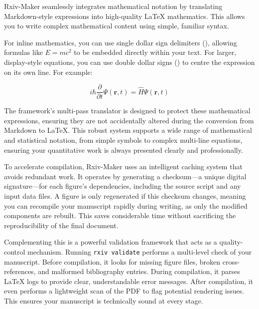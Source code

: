 Rxiv-Maker seamlessly integrates mathematical notation by translating Markdown-style expressions into high-quality LaTeX mathematics. This allows you to write complex mathematical content using simple, familiar syntax.

For inline mathematics, you can use single dollar sign delimiters (\texttt{}), allowing formulas like $E = mc^2$ to be embedded directly within your text. For larger, display-style equations, you can use double dollar signs (\texttt{}) to centre the expression on its own line. For example:

$$
i\hbar\frac{\partial}{\partial t}\Psi(\mathbf{r},t) = \hat{H}\Psi(\mathbf{r},t)
$$

The framework's multi-pass translator is designed to protect these mathematical expressions, ensuring they are not accidentally altered during the conversion from Markdown to LaTeX. This robust system supports a wide range of mathematical and statistical notation, from simple symbols to complex multi-line equations, ensuring your quantitative work is always presented clearly and professionally.

\label{snote:caching_validation}

To accelerate compilation, Rxiv-Maker uses an intelligent caching system that avoids redundant work. It operates by generating a checksum—a unique digital signature—for each figure's dependencies, including the source script and any input data files. A figure is only regenerated if this checksum changes, meaning you can recompile your manuscript rapidly during writing, as only the modified components are rebuilt. This saves considerable time without sacrificing the reproducibility of the final document.

Complementing this is a powerful validation framework that acts as a quality-control mechanism. Running \texttt{rxiv validate} performs a multi-level check of your manuscript. Before compilation, it looks for missing figure files, broken cross-references, and malformed bibliography entries. During compilation, it parses LaTeX logs to provide clear, understandable error messages. After compilation, it even performs a lightweight scan of the PDF to flag potential rendering issues. This ensures your manuscript is technically sound at every stage.




